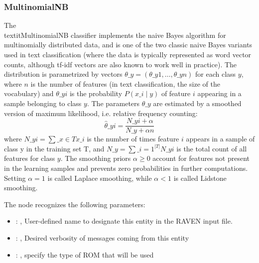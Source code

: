 \subsubsection{MultinomialNB}
  The \\textit{MultinomialNB} classifier implements the naive Bayes algorithm for
  multinomially distributed data, and is one of the two classic naive Bayes
  variants used in text classification (where the data is typically represented
  as word vector counts, although tf-idf vectors are also known to work well in
  practice).                         The distribution is parametrized by vectors $\theta\_y =
  (\theta\_{y1},\ldots,\theta\_{yn})$ for each class $y$, where $n$ is the number of
  features (in text classification, the size of the vocabulary) and $\theta\_{yi}$
  is the probability $P(x\_i \mid y)$ of feature $i$ appearing in a sample
  belonging to class $y$.                         The parameters $\theta\_y$ are estimated by a
  smoothed version of maximum                         likelihood, i.e. relative frequency counting:
  \begin{equation}                         \hat{\theta}\_{yi} = \frac{ N\_{yi} + \alpha}{N\_y + \alpha
  n}                         \end{equation}                         where $N\_{yi} = \sum\_{x \in T}
  x\_i$ is the number of times feature $i$ appears                         in a sample of class y in
  the training set T, and                         $N\_{y} = \sum\_{i=1}^{|T|} N\_{yi}$ is the total
  count of all features for class                         $y$.                         The smoothing
  priors $\alpha \ge 0$ account for features not present in the                         learning
  samples and prevents zero probabilities in further computations.                         Setting
  $\alpha = 1$ is called Laplace smoothing, while $\alpha < 1$ is called
  Lidstone smoothing.                         

  The  node recognizes the following parameters:
    \begin{itemize}
      \item {}: , 
        User-defined name to designate this entity in the RAVEN input file.
      \item {}: , 
        Desired verbosity of messages coming from this entity
      \item {}: , 
        specify the type of ROM that will be used
  \end{itemize}

